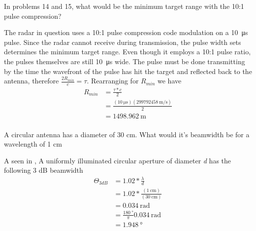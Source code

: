 \documentclass[12pt]{article}
\newenvironment{exercise}[2][Exercise]{\begin{trivlist}
    \item[\hskip \labelsep {\bfseries #1}\hskip \labelsep {\bfseries #2.}]}{\end{trivlist}}
\begin{document}
      \begin{exercise}{5}
      In problems 14 and 15, what would be the minimum target range with the 10:1 pulse compression?

      The radar in question uses a 10:1 pulse compression code modulation on a \SI{10}{\us} pulse. Since the radar cannot receive during transmission, the pulse width sets determines the minimum target range. Even though it employs a 10:1 pulse ratio, the pulses themselves are still \SI{10}{\us} wide. The pulse must be done transmitting by the time the wavefront of the pulse has hit the target and reflected back to the antenna, therefore $\frac{ 2 R_{min} }{c} = \tau$. Rearranging for $R_{min}$ we have
      \begin{align*}
      R_{min} & = \frac{\tau * c}{2}\\
      & = \frac{ (\SI{10}{\us}) (\SI{299792458}{\meter\per\second}) }{ 2 }\\
      & = \SI{1498.962}{\meter}\\
      \end{align*}
      \end{exercise}

      \begin{exercise}{6}
      A circular antenna has a diameter of 30 cm. What would it's beamwidth be for a wavelength of 1 cm 

      A seen in \cite[p.~113]{IAR}, A uniformly illuminated circular aperture of diameter \textit{d} has the following 3 dB beamwidth
      \begin{align*}
      \Theta_{3 dB} & = 1.02 * \frac{\lambda}{d}\\
      & = 1.02 * \frac{(\SI{1}{\cm})}{(\SI{30}{\cm})}\\
      & = \SI{0.034}{\radian}\\
      & = \frac{\SI{180}{\degree}}{\pi}\SI{0.034}{\radian}\\
      & = \SI{1.948}{\degree}
      \end{align*}
      \end{exercise}
\end{document}
